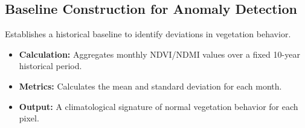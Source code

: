 \subsection{Baseline Construction for Anomaly Detection}
Establishes a historical baseline to identify deviations in vegetation behavior.
\begin{itemize}
    \item \textbf{Calculation:} Aggregates monthly NDVI/NDMI values over a fixed 10-year historical period.
    \item \textbf{Metrics:} Calculates the mean and standard deviation for each month.
    \item \textbf{Output:} A climatological signature of normal vegetation behavior for each pixel.
\end{itemize}




